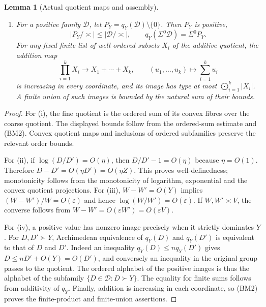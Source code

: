 \documentclass[11pt]{article}
\newtheorem{lemma}[theorem]{Lemma}
\theoremstyle{definition}
\theoremstyle{remark}
\newcommand{\arch}{\mathrel{\asymp}}
\numberwithin{equation}{section}
\begin{document}
\begin{lemma}[Actual quotient maps and assembly]
\begin{enumerate}[label=\textup{(\roman*)},leftmargin=3em]
\item For a positive family $\mathcal D$, let
$P_Y=q_Y(\mathcal D)\setminus\{0\}$.  Then $P_Y$ is positive,
\begin{equation}
 |P_Y/\arch|\le|\mathcal D/\arch|,\qquad
 q_Y(\Sigma^0\mathcal D)=\Sigma^0P_Y.
 \label{l-eq:positive-quotient-alphabet}
\end{equation}
For any fixed finite list of well-ordered subsets $X_i$ of the
additive quotient, the addition map
\begin{equation}
 \prod_{i=1}^kX_i\longrightarrow X_1+\cdots+X_k,
 \qquad (u_1,\ldots,u_k)\longmapsto\sum_{i=1}^ku_i
 \label{l-eq:finite-quotient-sum}
\end{equation}
is increasing in every coordinate, and its image has type at
most $\bigodot_{i=1}^k|X_i|$.  A finite union of such images is
bounded by the natural sum of their bounds.
\end{enumerate}
\end{lemma}
\begin{proof}
For (i), the fine quotient is the ordered sum of its convex
fibres over the coarse quotient.  The displayed bounds follow
from the ordered-sum estimate and (BM2).  Convex quotient maps
and inclusions of ordered subfamilies preserve the relevant
order bounds.

For (ii), if $\log(D/D')=O(\eta)$, then
$D/D'-1=O(\eta)$ because $\eta=O(1)$.  Therefore
$D-D'=O(\eta D')=O(\eta Z)$.  This proves well-definedness;
monotonicity follows from the monotonicity of logarithm,
exponential and the convex quotient projections.  For (iii),
$W-W'=O(Y)$ implies $(W-W')/W=O(\varepsilon)$ and hence
$\log(W/W')=O(\varepsilon)$.  If $W,W'\arch V$, the converse
follows from $W-W'=O(\varepsilon W')=O(\varepsilon V)$.

For (iv), a positive value has nonzero image precisely when it
strictly dominates $Y$.  For $D,D'\succ Y$, Archimedean
equivalence of $q_Y(D)$ and $q_Y(D')$ is equivalent to that of
$D$ and $D'$.  Indeed an inequality
$q_Y(D)\le n q_Y(D')$ gives
$D\le nD'+O(Y)=O(D')$, and conversely an inequality in the
original group passes to the quotient.  The ordered alphabet
of the positive images is thus the alphabet of the subfamily
$\{D\in\mathcal D:D\succ Y\}$.  The equality for finite sums
follows from additivity of $q_Y$.  Finally, addition is increasing
in each coordinate, so (BM2) proves the finite-product and
finite-union assertions.
\end{proof}
\end{document}
